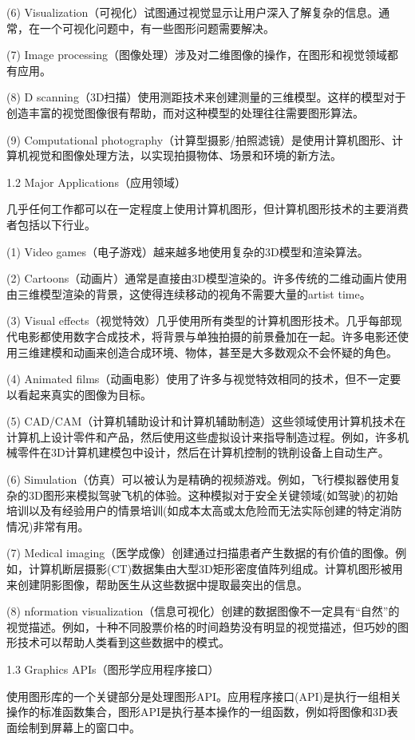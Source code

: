 (6) Visualization（可视化）试图通过视觉显示让用户深入了解复杂的信息。通常，在一个可视化问题中，有一些图形问题需要解决。

(7) Image processing（图像处理）涉及对二维图像的操作，在图形和视觉领域都有应用。

(8) D scanning（3D扫描）使用测距技术来创建测量的三维模型。这样的模型对于创造丰富的视觉图像很有帮助，而对这种模型的处理往往需要图形算法。

(9) Computational photography（计算型摄影/拍照滤镜）是使用计算机图形、计算机视觉和图像处理方法，以实现拍摄物体、场景和环境的新方法。

1.2 Major Applications（应用领域）

几乎任何工作都可以在一定程度上使用计算机图形，但计算机图形技术的主要消费者包括以下行业。

(1) Video games（电子游戏）越来越多地使用复杂的3D模型和渲染算法。

(2) Cartoons（动画片）通常是直接由3D模型渲染的。许多传统的二维动画片使用由三维模型渲染的背景，这使得连续移动的视角不需要大量的artist time。

(3) Visual effects（视觉特效）几乎使用所有类型的计算机图形技术。几乎每部现代电影都使用数字合成技术，将背景与单独拍摄的前景叠加在一起。许多电影还使用三维建模和动画来创造合成环境、物体，甚至是大多数观众不会怀疑的角色。

(4) Animated films（动画电影）使用了许多与视觉特效相同的技术，但不一定要以看起来真实的图像为目标。

(5) CAD/CAM（计算机辅助设计和计算机辅助制造）这些领域使用计算机技术在计算机上设计零件和产品，然后使用这些虚拟设计来指导制造过程。例如，许多机械零件在3D计算机建模包中设计，然后在计算机控制的铣削设备上自动生产。

(6) Simulation（仿真）可以被认为是精确的视频游戏。例如，飞行模拟器使用复杂的3D图形来模拟驾驶飞机的体验。这种模拟对于安全关键领域(如驾驶)的初始培训以及有经验用户的情景培训(如成本太高或太危险而无法实际创建的特定消防情况)非常有用。

(7) Medical imaging（医学成像）创建通过扫描患者产生数据的有价值的图像。例如，计算机断层摄影(CT)数据集由大型3D矩形密度值阵列组成。计算机图形被用来创建阴影图像，帮助医生从这些数据中提取最突出的信息。

(8) nformation visualization（信息可视化）创建的数据图像不一定具有“自然”的视觉描述。例如，十种不同股票价格的时间趋势没有明显的视觉描述，但巧妙的图形技术可以帮助人类看到这些数据中的模式。

1.3 Graphics APIs（图形学应用程序接口）

使用图形库的一个关键部分是处理图形API。应用程序接口(API)是执行一组相关操作的标准函数集合，图形API是执行基本操作的一组函数，例如将图像和3D表面绘制到屏幕上的窗口中。

